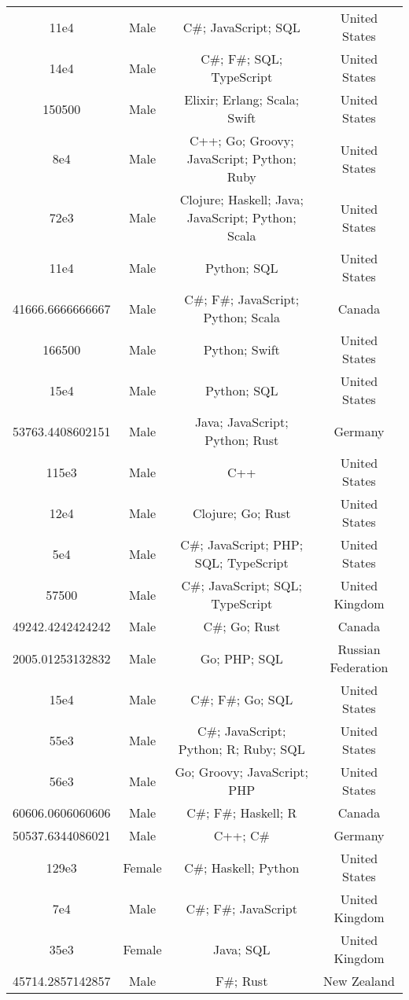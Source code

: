 \begin{center}
\begin{tabular}{ |c|c|c|c| }
11e4  &  Male  &  C\#; JavaScript; SQL  &  United States  \\ 
14e4  &  Male  &  C\#; F\#; SQL; TypeScript  &  United States  \\ 
150500  &  Male  &  Elixir; Erlang; Scala; Swift  &  United States  \\ 
8e4  &  Male  &  C++; Go; Groovy; JavaScript; Python; Ruby  &  United States  \\ 
72e3  &  Male  &  Clojure; Haskell; Java; JavaScript; Python; Scala  &  United States  \\ 
11e4  &  Male  &  Python; SQL  &  United States  \\ 
41666.6666666667  &  Male  &  C\#; F\#; JavaScript; Python; Scala  &  Canada  \\ 
166500  &  Male  &  Python; Swift  &  United States  \\ 
15e4  &  Male  &  Python; SQL  &  United States  \\ 
53763.4408602151  &  Male  &  Java; JavaScript; Python; Rust  &  Germany  \\ 
115e3  &  Male  &  C++  &  United States  \\ 
12e4  &  Male  &  Clojure; Go; Rust  &  United States  \\ 
5e4  &  Male  &  C\#; JavaScript; PHP; SQL; TypeScript  &  United States  \\ 
57500  &  Male  &  C\#; JavaScript; SQL; TypeScript  &  United Kingdom  \\ 
49242.4242424242  &  Male  &  C\#; Go; Rust  &  Canada  \\ 
2005.01253132832  &  Male  &  Go; PHP; SQL  &  Russian Federation  \\ 
15e4  &  Male  &  C\#; F\#; Go; SQL  &  United States  \\ 
55e3  &  Male  &  C\#; JavaScript; Python; R; Ruby; SQL  &  United States  \\ 
56e3  &  Male  &  Go; Groovy; JavaScript; PHP  &  United States  \\ 
60606.0606060606  &  Male  &  C\#; F\#; Haskell; R  &  Canada  \\ 
50537.6344086021  &  Male  &  C++; C\#  &  Germany  \\ 
129e3  &  Female  &  C\#; Haskell; Python  &  United States  \\ 
7e4  &  Male  &  C\#; F\#; JavaScript  &  United Kingdom  \\ 
35e3  &  Female  &  Java; SQL  &  United Kingdom  \\ 
45714.2857142857  &  Male  &  F\#; Rust  &  New Zealand  \\ 

\end{tabular}
\end{center}
